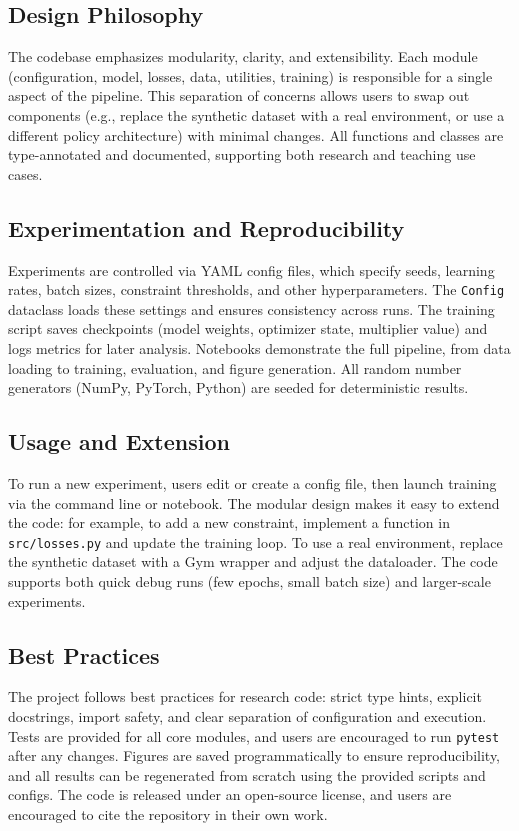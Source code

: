 \subsection{Design Philosophy}
The codebase emphasizes modularity, clarity, and extensibility. Each module (configuration, model, losses, data, utilities, training) is responsible for a single aspect of the pipeline. This separation of concerns allows users to swap out components (e.g., replace the synthetic dataset with a real environment, or use a different policy architecture) with minimal changes. All functions and classes are type-annotated and documented, supporting both research and teaching use cases.

\subsection{Experimentation and Reproducibility}
Experiments are controlled via YAML config files, which specify seeds, learning rates, batch sizes, constraint thresholds, and other hyperparameters. The \texttt{Config} dataclass loads these settings and ensures consistency across runs. The training script saves checkpoints (model weights, optimizer state, multiplier value) and logs metrics for later analysis. Notebooks demonstrate the full pipeline, from data loading to training, evaluation, and figure generation. All random number generators (NumPy, PyTorch, Python) are seeded for deterministic results.

\subsection{Usage and Extension}
To run a new experiment, users edit or create a config file, then launch training via the command line or notebook. The modular design makes it easy to extend the code: for example, to add a new constraint, implement a function in \texttt{src/losses.py} and update the training loop. To use a real environment, replace the synthetic dataset with a Gym wrapper and adjust the dataloader. The code supports both quick debug runs (few epochs, small batch size) and larger-scale experiments.

\subsection{Best Practices}
The project follows best practices for research code: strict type hints, explicit docstrings, import safety, and clear separation of configuration and execution. Tests are provided for all core modules, and users are encouraged to run \texttt{pytest} after any changes. Figures are saved programmatically to ensure reproducibility, and all results can be regenerated from scratch using the provided scripts and configs. The code is released under an open-source license, and users are encouraged to cite the repository in their own work.

